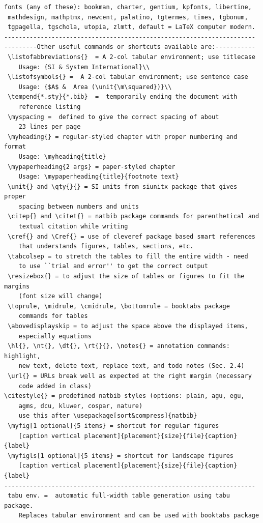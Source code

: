 \documentclass[phd]{ndsu-thesis-2022}
\renewcommand\myspacing{1.9} %
\begin{document}
\begin{lstlisting}[basicstyle=\ttfamily\footnotesize\color{blue}]
 fonts (any of these): bookman, charter, gentium, kpfonts, libertine, 
 mathdesign, mathptmx, newcent, palatino, tgtermes, times, tgbonum, 
 tgpagella, tgschola, utopia, zlmtt, default = LaTeX computer modern. 
---------------------------------------------------------------------
---------Other useful commands or shortcuts available are:-----------
 \listofabbreviations{}  = A 2-col tabular environment; use titlecase 
 	Usage: {SI & System International}\\
 \listofsymbols{} =  A 2-col tabular environment; use sentence case
 	Usage: {$A$ &  Area (\unit{\m\squared})}\\
 \tempend{*.sty}{*.bib}  =  temporarily ending the document with 
 	reference listing
 \myspacing =  defined to give the correct spacing of about 
 	23 lines per page
 \myheading{} = regular-styled chapter with proper numbering and format
 	Usage: \myheading{title}
 \mypaperheading{2 args} = paper-styled chapter 
 	Usage: \mypaperheading{title}{footnote text}
 \unit{} and \qty{}{} = SI units from siunitx package that gives proper 
 	spacing between numbers and units
 \citep{} and \citet{} = natbib package commands for parenthetical and 
 	textual citation while writing 
 \cref{} and \Cref{} = use of cleveref package based smart references 
 	that understands figures, tables, sections, etc. 
 \tabcolsep = to stretch the tables to fill the entire width - need
 	to use ``trial and error'' to get the correct output
 \resizebox{} = to adjust the size of tables or figures to fit the margins 
 	(font size will change)
 \toprule, \midrule, \cmidrule, \bottomrule = booktabs package 
 	commands for tables
 \abovedisplayskip = to adjust the space above the displayed items, 
 	especially equations 
 \hl{}, \nt{}, \dt{}, \rt{}{}, \notes{} = annotation commands: highlight, 
 	new text, delete text, replace text, and todo notes (Sec. 2.4)
 \url{} = URLs break well as expected at the right margin (necessary 
 	code added in class)	
\citestyle{} = predefined natbib styles (options: plain, agu, egu, 
	agms, dcu, kluwer, cospar, nature) 
	use this after \usepackage[sort&compress]{natbib}
 \myfig[1 optional]{5 items} = shortcut for regular figures 
 	[caption vertical placement]{placement}{size}{file}{caption}{label}
 \myfigls[1 optional]{5 items} = shortcut for landscape figures 
 	[caption vertical placement]{placement}{size}{file}{caption}{label}	
---------------------------------------------------------------------
 tabu env. =  automatic full-width table generation using tabu package. 
 	Replaces tabular environment and can be used with booktabs package

\end{lstlisting}
\end{document}
